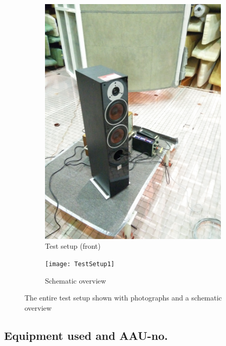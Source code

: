 \begin{figure}[H]
\begin{subfigure}[t]{0.47\textwidth}
	\includegraphics[width=1\textwidth]{figures/Test_setup_front.jpg}
	\caption{Test setup (front)}
	\label{fig:test_setup_front_R}
\end{subfigure}
\begin{subfigure}[b]{\textwidth}
	\centering
%	
	\texttt{[image: TestSetup1]}
	\caption{Schematic overview}
	\label{figure:SpeakertestSetup}	
\end{subfigure}
\caption{The entire test setup shown with photographs and a schematic overview}
\label{fig:test_setup_R}
\end{figure}


\subsection*{Equipment used and AAU-no.}

